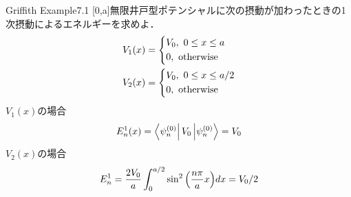\documentclass{report}
\begin{document}
  \begin{myexc}{Griffith Example7.1}{}
    [0,a]無限井戸型ポテンシャルに次の摂動が加わったときの1次摂動によるエネルギーを求めよ．
    \begin{align}
      V_1(x)&=
      \begin{dcases}
      V_0,\ 0\leq x\leq a\\
      0,\ \mathrm{otherwise}
      \end{dcases}\\
      V_2(x)&=
      \begin{dcases}
      V_0,\ 0\leq x \leq a/2\\
      0,\ \mathrm{otherwise}
      \end{dcases}
    \end{align}
    \tcblower
    $V_1(x)$の場合
    \begin{align}
      E_n^1(x)=\bra{\psi_n^{(0)}}V_0\ket{\psi_n^{(0)}}=V_0
    \end{align}
    $V_2(x)$の場合
    \begin{align}
      E_n^1=\frac{2V_0}{a}\int_{0}^{a/2}\sin^2\qty(\frac{n\pi}{a}x)dx=V_0/2
    \end{align}
  \end{myexc}
\end{document}
